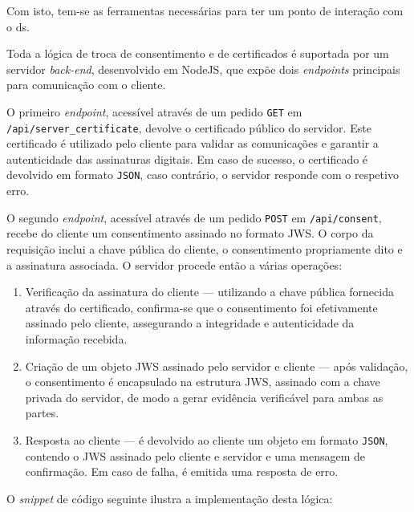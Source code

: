 

Com isto, tem-se as ferramentas necessárias para ter um ponto de interação com o \acrshort{ds}.

Toda a lógica de troca de consentimento e de certificados é suportada por um servidor \textit{back-end}, desenvolvido em NodeJS, que expõe dois \textit{endpoints} principais para comunicação com o cliente.

O primeiro \textit{endpoint}, acessível através de um pedido \texttt{GET} em \texttt{/api/server\_certificate}, devolve o certificado público do servidor. Este certificado é utilizado pelo cliente para validar as comunicações e garantir a autenticidade das assinaturas digitais. Em caso de sucesso, o certificado é devolvido em formato \texttt{JSON}, caso contrário, o servidor responde com o respetivo erro.

O segundo \textit{endpoint}, acessível através de um pedido \texttt{POST} em \texttt{/api/consent}, recebe do cliente um consentimento assinado no formato JWS. O corpo da requisição inclui a chave pública do cliente, o consentimento propriamente dito e a assinatura associada. O servidor procede então a várias operações:

\begin{enumerate}
    \item Verificação da assinatura do cliente — utilizando a chave pública fornecida através do certificado, confirma-se que o consentimento foi efetivamente assinado pelo cliente, assegurando a integridade e autenticidade da informação recebida.
    \item Criação de um objeto JWS assinado pelo servidor e cliente — após validação, o consentimento é encapsulado na estrutura JWS, assinado com a chave privada do servidor, de modo a gerar evidência verificável para ambas as partes.
    \item Resposta ao cliente — é devolvido ao cliente um objeto em formato \texttt{JSON}, contendo o JWS assinado pelo cliente e servidor e uma mensagem de confirmação. Em caso de falha, é emitida uma resposta de erro.
\end{enumerate}

O \textit{snippet} de código seguinte ilustra a implementação desta lógica:

